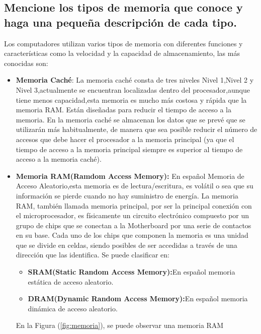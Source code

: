 \documentclass{article}
\begin{document}
\subsection{Mencione los tipos de memoria que conoce y haga una pequeña descripción de cada tipo.}
Los computadores utilizan varios tipos de memoria con diferentes funciones y características como la velocidad y la capacidad de almacenamiento, las más conocidas son:
\begin{itemize}
\item \textbf{Memoria Caché}:
    La memoria caché consta de tres niveles Nivel 1,Nivel 2 y Nivel 3,actualmente se encuentran localizadas dentro del procesador,aunque tiene menos capacidad,esta memoria es mucho más costosa y rápida que la memoria RAM.\cite{ref}\newline
    Están diseñadas para reducir el tiempo de acceso a la memoria. En la memoria caché se almacenan los datos que se prevé que se utilizarán más habitualmente, de manera que sea posible reducir el número de accesos que debe hacer el procesador a la memoria principal (ya que el tiempo de acceso a la memoria principal siempre es superior al tiempo de acceso a la memoria caché).\cite{Orenga}

    \item \textbf{Memoria RAM(Ramdom Access Memory): }En español Memoria de Acceso Aleatorio,esta memoria es de lectura/escritura, es volátil o sea que su información se pierde cuando no hay suministro de energía.\newpage
    La memoria RAM, también llamada memoria principal, por ser la principal conexión con el microprocesador, es físicamente un circuito electrónico compuesto por un grupo de chips que se conectan a la Motherboard por una serie de contactos en su base. Cada uno de los chips que componen la memoria es una unidad que se divide en celdas, siendo posibles de ser accedidas a través de una dirección que las identifica.\cite{ram}
    \newline
    Se puede clasificar en:
    \begin{itemize}
        \item\textbf{SRAM(Static Random Access Memory):}En español memoria estática de acceso aleatorio.
        \item\textbf{DRAM(Dynamic Random Access Memory):}En español memoria dinámica de acceso aleatorio.
    \end{itemize}
    
    En la Figura (\ref{fig:memoria}), se puede observar una memoria RAM
    

\end{itemize}
\end{document}
